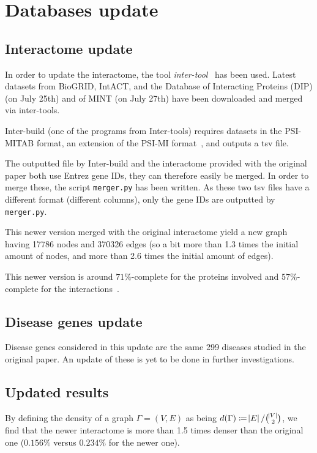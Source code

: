 \documentclass[letterpaper]{article}
\begin{document}
\section{Databases update}

	\subsection{Interactome update}
	In order to update the interactome, the tool \textit{inter-tool}~\citep{inter-tools} has been used.
	Latest datasets from BioGRID, IntACT, and the Database of Interacting Proteins (DIP)
	(on July 25th) and of MINT (on July 27th) have been downloaded and merged via inter-tools.

	Inter-build (one of the programs from Inter-tools) requires datasets in the PSI-MITAB format, an extension of the
	PSI-MI format~\citep{MITABFormat}, and outputs a tsv file.

	The outputted file by Inter-build and the interactome provided with the original paper both use Entrez gene IDs, they
	can therefore easily be merged. In order to merge these, the script \texttt{merger.py} has been written. As these two
	tsv files have a different format (different columns), only the gene IDs are outputted by \texttt{merger.py}.

	This newer version merged with the original interactome yield a new graph having 17786 nodes and 370326 edges
	(so a bit more than 1.3 times the initial amount of nodes, and more than 2.6 times the initial amount of edges).

	This newer version is around $71\%$-complete for the proteins involved and $57\%$-complete for the
	interactions~\citep{estimatingTheSizeOfTheHumanInteractome,ATruerMeasureOfOurIgnorance}.

	\subsection{Disease genes update}
	Disease genes considered in this update are the same 299 diseases studied in the original paper. An update of these
	is yet to be done in further investigations.

	\subsection{Updated results}
	By defining the density of a graph $\Gamma = (V, E)$ as being $d(\Gamma) \coloneqq \abs E/\binom {\abs V}2$,
	we find that the newer interactome is more than 1.5 times denser than the original one ($0.156\%$ versus $0.234\%$
	for the newer one).
\end{document}
